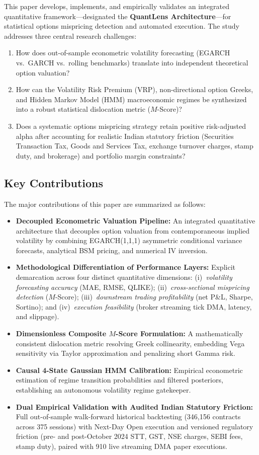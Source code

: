 \documentclass[journal]{IEEEtran}
\begin{document}
This paper develops, implements, and empirically validates an integrated quantitative framework---designated the \textbf{QuantLens Architecture}---for statistical options mispricing detection and automated execution. The study addresses three central research challenges:
\begin{enumerate}
    \item How does out-of-sample econometric volatility forecasting (EGARCH vs.\ GARCH vs.\ rolling benchmarks) translate into independent theoretical option valuation?
    \item How can the Volatility Risk Premium (VRP), non-directional option Greeks, and Hidden Markov Model (HMM) macroeconomic regimes be synthesized into a robust statistical dislocation metric ($M$-Score)?
    \item Does a systematic options mispricing strategy retain positive risk-adjusted alpha after accounting for realistic Indian statutory friction (Securities Transaction Tax, Goods and Services Tax, exchange turnover charges, stamp duty, and brokerage) and portfolio margin constraints?
\end{enumerate}

\subsection*{Key Contributions}
The major contributions of this paper are summarized as follows:
\begin{itemize}
    \item \textbf{Decoupled Econometric Valuation Pipeline:} An integrated quantitative architecture that decouples option valuation from contemporaneous implied volatility by combining EGARCH(1,1,1) asymmetric conditional variance forecasts, analytical BSM pricing, and numerical IV inversion.
    \item \textbf{Methodological Differentiation of Performance Layers:} Explicit demarcation across four distinct quantitative dimensions: (i)~\emph{volatility forecasting accuracy} (MAE, RMSE, QLIKE); (ii)~\emph{cross-sectional mispricing detection} ($M$-Score); (iii)~\emph{downstream trading profitability} (net P\&L, Sharpe, Sortino); and (iv)~\emph{execution feasibility} (broker streaming tick DMA, latency, and slippage).
    \item \textbf{Dimensionless Composite $M$-Score Formulation:} A mathematically consistent dislocation metric resolving Greek collinearity, embedding Vega sensitivity via Taylor approximation and penalizing short Gamma risk.
    \item \textbf{Causal 4-State Gaussian HMM Calibration:} Empirical econometric estimation of regime transition probabilities and filtered posteriors, establishing an autonomous volatility regime gatekeeper.
    \item \textbf{Dual Empirical Validation with Audited Indian Statutory Friction:} Full out-of-sample walk-forward historical backtesting (346{,}156 contracts across 375 sessions) with Next-Day Open execution and versioned regulatory friction (pre- and post-October 2024 STT, GST, NSE charges, SEBI fees, stamp duty), paired with 910 live streaming DMA paper executions.
\end{itemize}
\end{document}
